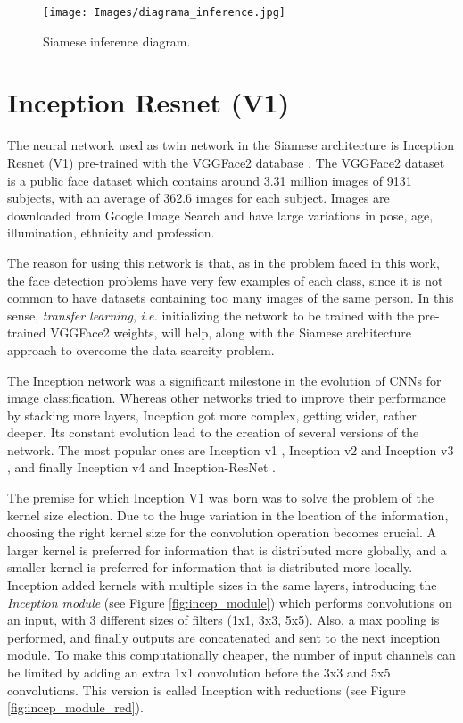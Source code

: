 \begin{figure*}[htbp]
        \centering
            \texttt{[image: Images/diagrama\_inference.jpg]}
             \caption[Siamese inference diagram.]
            {\small Siamese inference diagram.}   
            \label{fig:diag_infer}
    \end{figure*}

\section{Inception Resnet (V1)}
\label{sec:resnet}
The neural network used as twin network in the Siamese architecture is Inception Resnet (V1) pre-trained with the VGGFace2 database \cite{cao2017vggface}. The VGGFace2 dataset is a public face dataset which contains around 3.31 million images of 9131 subjects, with an average of 362.6 images for each subject. Images are downloaded from Google Image Search and have large variations in pose, age, illumination, ethnicity and profession.

The reason for using this network is that, as in the problem faced in this work, the face detection problems have very few examples of each class, since it is not common to have datasets containing too many images of the same person. In this sense, \emph{transfer learning}, \emph{i.e.} initializing the network to be trained with the pre-trained VGGFace2 weights, will help, along with the Siamese architecture approach to overcome the data scarcity problem.

The Inception network was a significant milestone in the evolution of CNNs for image classification. Whereas other networks tried to improve their performance by stacking more layers, Inception got more complex, getting wider, rather deeper. Its constant evolution lead to the creation of several versions of the network. The most popular ones are Inception v1 \cite{inceptionv1}, Inception v2 and Inception v3  \cite{inceptionv2}, and finally Inception v4 and Inception-ResNet \cite{inceptionresnet}. 

The premise for which Inception V1 was born was to solve the problem of the kernel size election. Due to the huge variation in the location of the information, choosing the right kernel size for the convolution operation becomes crucial. A larger kernel is preferred for information that is distributed more globally, and a smaller kernel is preferred for information that is distributed more locally. Inception added kernels with multiple sizes in the same layers, introducing the \emph{Inception module} (see Figure \ref{fig:incep_module}) which performs convolutions on an input, with 3 different sizes of filters (1x1, 3x3, 5x5). Also, a max pooling is performed, and finally outputs are concatenated and sent to the next inception module. To make this computationally cheaper, the number of input channels can be limited by adding an extra 1x1 convolution before the 3x3 and 5x5 convolutions. This version is called Inception with reductions (see Figure \ref{fig:incep_module_red}).

